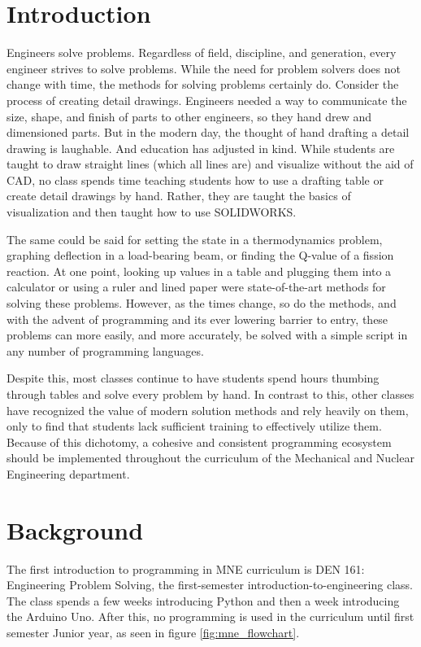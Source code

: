 \section{Introduction}

Engineers solve problems. Regardless of field, discipline, and generation, every engineer
strives to solve problems. While the need for problem solvers does not change with time,
the methods for solving problems certainly do. Consider the process of creating detail 
drawings. Engineers needed a way to communicate the size, shape, and finish of parts to 
other engineers, so they hand drew and dimensioned parts. But in the modern day, the 
thought of hand drafting a detail drawing is laughable. And education has adjusted in
kind. While students are taught to draw straight lines (which all lines are) and visualize
without the aid of CAD, no class spends time teaching students how to use a drafting table
or create detail drawings by hand. Rather, they are taught the basics of visualization
and then taught how to use SOLIDWORKS.

The same could be said for setting the state in a thermodynamics problem, graphing
deflection in a load-bearing beam, or finding the Q-value of a fission reaction. At one
point, looking up values in a table and plugging them into a calculator or using a ruler
and lined paper were state-of-the-art methods for solving these problems. However, as the 
times change, so do the methods, and with the advent of programming and its ever lowering 
barrier to entry, these problems can more easily, and more accurately, be solved with a 
simple script in any number of programming languages.

Despite this, most classes continue to have students spend hours thumbing through tables
and solve every problem by hand. In contrast to this, other classes have recognized the
value of modern solution methods and rely heavily on them, only to find that students
lack sufficient training to effectively utilize them. Because of this dichotomy, a cohesive 
and consistent programming ecosystem should be implemented throughout the curriculum 
of the Mechanical and Nuclear Engineering department.


\section{Background}

The first introduction to programming in MNE curriculum is DEN 161: Engineering Problem Solving,
the first-semester introduction-to-engineering class. The class spends a few weeks introducing
Python and then a week introducing the Arduino Uno. After this, no programming is used in the
curriculum until first semester Junior year, as seen in figure \ref{fig:mne_flowchart}. 

